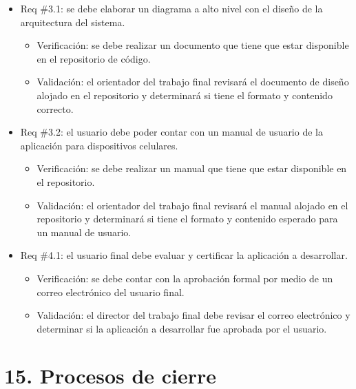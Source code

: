 \documentclass[
11pt, %
]{charter}
\begin{document}
\begin{itemize}
\item Req \#3.1: se debe elaborar un diagrama a alto nivel con el diseño de la arquitectura del sistema.

\begin{itemize}
	\item Verificación: se debe realizar un documento que tiene que estar disponible en el repositorio de código.
	\item Validación: el orientador del trabajo final revisará el documento de diseño alojado en el repositorio y determinará si tiene el formato y contenido correcto.
\end{itemize}

\item Req \#3.2: el usuario debe poder contar con un manual de usuario de la aplicación para dispositivos celulares.

\begin{itemize}
	\item Verificación: se debe realizar un manual que tiene que estar disponible en el repositorio.
	\item Validación: el orientador del trabajo final revisará el manual alojado en el repositorio y determinará si tiene el formato y contenido esperado para un manual de usuario.
\end{itemize}

\item Req \#4.1: el usuario final debe evaluar y certificar la aplicación a desarrollar.

\begin{itemize}
	\item Verificación: se debe contar con la aprobación formal por medio de un correo electrónico del usuario final.
	\item Validación: el director del trabajo final debe revisar el correo electrónico y determinar si la aplicación a desarrollar fue aprobada por el usuario.
\end{itemize}



\end{itemize}

\section{15. Procesos de cierre}    
\label{sec:cierre}
\end{document}
